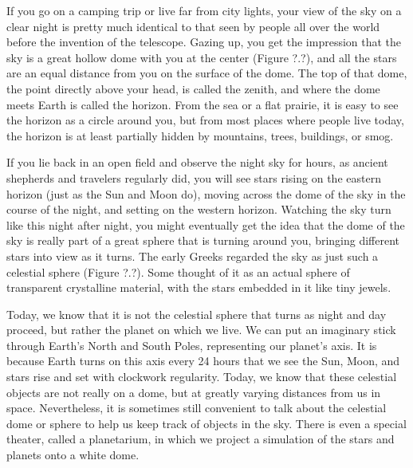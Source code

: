 \documentclass[../../main-astronomy.tex]{subfiles}
\begin{document}
If you go on a camping trip or live far from city lights, your view of the sky on a clear night is pretty much identical to that seen by people all over the world before the invention of the telescope. Gazing up, you get the impression that the sky is a great hollow dome with you at the center (Figure ?.?), and all the stars are an equal distance from you on the surface of the dome. The top of that dome, the point directly above your head, is called the \gls{zenith}, and where the dome meets Earth is called the \gls{horizon}. From the sea or a flat prairie, it is easy to see the horizon as a circle around you, but from most places where people live today, the horizon is at least partially hidden by mountains, trees, buildings, or smog.


\vspace{1em}

If you lie back in an open field and observe the night sky for hours, as ancient shepherds and travelers regularly did, you will see stars rising on the eastern horizon (just as the Sun and Moon do), moving across the dome of the sky in the course of the night, and setting on the western horizon. Watching the sky turn like this night after night, you might eventually get the idea that the dome of the sky is really part of a great sphere that is turning around you, bringing different stars into view as it turns. The early Greeks regarded the sky as just such a celestial sphere (Figure ?.?). Some thought of it as an actual sphere of transparent crystalline material, with the stars embedded in it like tiny jewels.

\vspace{1em}

Today, we know that it is not the celestial sphere that turns as night and day proceed, but rather the planet on which we live. We can put an imaginary stick through Earth's North and South Poles, representing our planet's axis. It is because Earth turns on this axis every 24 hours that we see the Sun, Moon, and stars rise and set with clockwork regularity. Today, we know that these celestial objects are not really on a dome, but at greatly varying distances from us in space. Nevertheless, it is sometimes still convenient to talk about the celestial dome or sphere to help us keep track of objects in the sky. There is even a special theater, called a planetarium, in which we project a simulation of the stars and planets onto a white dome.

\vspace{1em}
\end{document}
